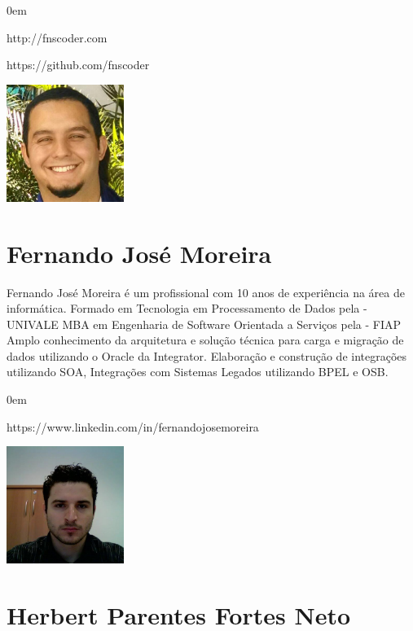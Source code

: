 \begin{description}
\itemsep0em 
\item[Website] http://fnscoder.com
\item[GitHub] https://github.com/fnscoder
\end{description}

\beforefig
\centerline{\includegraphics[height=1.50in]{translators/felipesouza.eps}}
\afterfig

\section*{Fernando José Moreira}

Fernando José Moreira é um profissional com 10 anos de experiência na área de informática. Formado em Tecnologia em Processamento de Dados pela - UNIVALE MBA em Engenharia de Software Orientada a Serviços pela - FIAP Amplo conhecimento da arquitetura e solução técnica para carga e migração de dados utilizando o Oracle da Integrator. Elaboração e construção de integrações utilizando SOA, Integrações com Sistemas Legados utilizando BPEL e OSB.

\begin{description}
\itemsep0em 
\item[LinkedIn] https://www.linkedin.com/in/fernandojosemoreira
\end{description}

\beforefig
\centerline{\includegraphics[height=1.50in]{translators/fernandojosemoreira.eps}}
\afterfig

\newpage

\section*{Herbert Parentes Fortes Neto}

